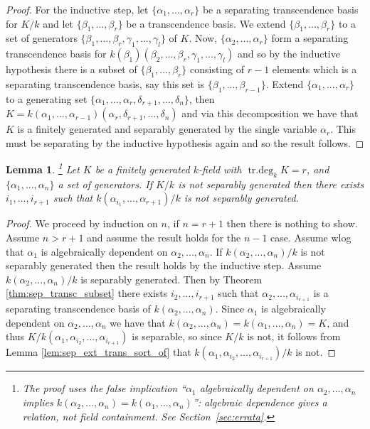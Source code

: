 \documentclass[12pt]{article}
\theoremstyle{plain}
\newtheorem{lemma}[thm]{Lemma}
\theoremstyle{definition}
\begin{document}
\begin{proof}
For the inductive step, let $\lbrace \alpha_1,...,\alpha_r\rbrace$ be a separating transcendence basis for $K/k$ and let $\lbrace \beta_1,...,\beta_r\rbrace$ be a transcendence basis. We extend $\lbrace \beta_1,...,\beta_r\rbrace$ to a set of generators $\lbrace \beta_1,...,\beta_r,\gamma_1,...,\gamma_l\rbrace$ of $K$. Now, $\lbrace \alpha_2,...,\alpha_r\rbrace$ form a separating transcendence basis for $k(\beta_1)(\beta_2,...,\beta_r,\gamma_1,...,\gamma_l)$ and so by the inductive hypothesis there is a subset of $\lbrace \beta_1,...,\beta_r\rbrace$ consisting of $r-1$ elements which is a separating transcendence basis, say this set is $\lbrace \beta_1,...,\beta_{r-1}\rbrace$. Extend $\lbrace \alpha_1,...,\alpha_r\rbrace$ to a generating set $\lbrace \alpha_1,...,\alpha_r,\delta_{r+1},...,\delta_n\rbrace$, then $K = k(\alpha_1,...,\alpha_{r-1})(\alpha_r,\delta_{r+1},...,\delta_{n})$ and via this decomposition we have that $K$ is a finitely generated and separably generated by the single variable $\alpha_r$. This must be separating by the inductive hypothesis again and so the result follows.
\end{proof}
\begin{lemma}
\label{lem:not_sep_ext}\footnote{The proof uses the false implication ``$\alpha_1$ algebraically dependent on $\alpha_2,\ldots,\alpha_n$ implies $k(\alpha_2,\ldots,\alpha_n)=k(\alpha_1,\ldots,\alpha_n)$'': algebraic dependence gives a relation, not field containment. See Section~\ref{sec:errata}.} Let $K$ be a finitely generated $k$-field with $\operatorname{tr.deg}_kK = r$, and $\lbrace \alpha_1,...,\alpha_n\rbrace$ a set of generators. If $K/k$ is not separably generated then there exists $i_1,...,i_{r+1}$ such that $k(\alpha_{i_1},...,\alpha_{r+1})/k$ is not separably generated.
\end{lemma}
\begin{proof}
We proceed by induction on $n$, if $n = r+1$ then there is nothing to show. Assume $n > r+1$ and assume the result holds for the $n-1$ case. Assume wlog that $\alpha_1$ is algebraically dependent on $\alpha_2,...,\alpha_n$. If $k(\alpha_2,...,\alpha_n)/k$ is not separably generated then the result holds by the inductive step. Assume $k(\alpha_2,...,\alpha_n)/k$ is separably generated. Then by Theorem \ref{thm:sep_transc_subset} there exists $i_2,...,i_{r+1}$ such that $\alpha_2,...,\alpha_{i_{r+1}}$ is a separating transcendence basis of $k(\alpha_2,...,\alpha_n)$. Since $\alpha_1$ is algebraically dependent on $\alpha_2,...,\alpha_n$ we have that $k(\alpha_2,...,\alpha_n) = k(\alpha_1,...,\alpha_n) = K$, and thus $K/k(\alpha_1,\alpha_{i_2},...,\alpha_{i_{r+1}})$ is separable, so since $K/k$ is not, it follows from Lemma \ref{lem:sep_ext_trans_sort_of} that $k(\alpha_1,\alpha_{i_2},...,\alpha_{i_{r+1}})/k$ is not.
\end{proof}
\end{document}
